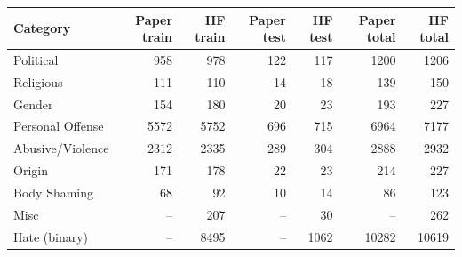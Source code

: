 \begin{tabular}{lrrrrrr}
\toprule
Category & Paper train & HF train & Paper test & HF test & Paper total & HF total \\
\midrule
Political & 958 & 978 & 122 & 117 & 1200 & 1206 \\
Religious & 111 & 110 & 14 & 18 & 139 & 150 \\
Gender & 154 & 180 & 20 & 23 & 193 & 227 \\
Personal Offense & 5572 & 5752 & 696 & 715 & 6964 & 7177 \\
Abusive/Violence & 2312 & 2335 & 289 & 304 & 2888 & 2932 \\
Origin & 171 & 178 & 22 & 23 & 214 & 227 \\
Body Shaming & 68 & 92 & 10 & 14 & 86 & 123 \\
Misc & -- & 207 & -- & 30 & -- & 262 \\
Hate (binary) & -- & 8495 & -- & 1062 & 10282 & 10619 \\
\bottomrule
\end{tabular}
